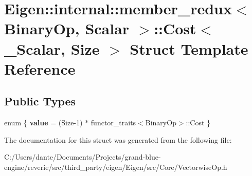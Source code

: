 \hypertarget{struct_eigen_1_1internal_1_1member__redux_1_1_cost}{}\section{Eigen\+::internal\+::member\+\_\+redux$<$ Binary\+Op, Scalar $>$\+::Cost$<$ \+\_\+\+Scalar, Size $>$ Struct Template Reference}
\label{struct_eigen_1_1internal_1_1member__redux_1_1_cost}
\subsection*{Public Types}
\begin{DoxyCompactItemize}
\item 
\mbox{\label{struct_eigen_1_1internal_1_1member__redux_1_1_cost_aa44a10eceefbc6d2d73b65e93b156c1c}} 
enum \{ {\bfseries value} = (Size-\/1) $\ast$ functor\+\_\+traits$<$Binary\+Op$>$\+::Cost
 \}
\end{DoxyCompactItemize}


The documentation for this struct was generated from the following file\+:\begin{DoxyCompactItemize}
\item 
C\+:/\+Users/dante/\+Documents/\+Projects/grand-\/blue-\/engine/reverie/src/third\+\_\+party/eigen/\+Eigen/src/\+Core/Vectorwise\+Op.\+h\end{DoxyCompactItemize}
